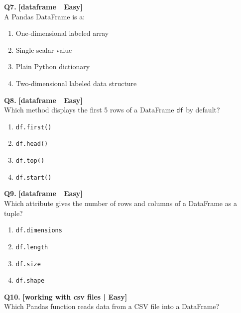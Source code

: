 \noindent\textbf{Q7.} \hfill {\small\color{LPUOrange}\textbf{[dataframe | Easy]}}\\[2pt]
A Pandas DataFrame is a:

\begin{enumerate}[label=(\alph*),topsep=2pt,itemsep=1pt,partopsep=0pt,parsep=0pt]
    \item \relax One-dimensional labeled array
    \item \relax Single scalar value
    \item \relax Plain Python dictionary
    \item \relax Two-dimensional labeled data structure
\end{enumerate}
\vspace{2mm}

\noindent\textbf{Q8.} \hfill {\small\color{LPUOrange}\textbf{[dataframe | Easy]}}\\[2pt]
Which method displays the first 5 rows of a DataFrame \texttt{df} by default?

\begin{enumerate}[label=(\alph*),topsep=2pt,itemsep=1pt,partopsep=0pt,parsep=0pt]
    \item \relax \texttt{df.first()}
    \item \relax \texttt{df.head()}
    \item \relax \texttt{df.top()}
    \item \relax \texttt{df.start()}
\end{enumerate}
\vspace{2mm}

\noindent\textbf{Q9.} \hfill {\small\color{LPUOrange}\textbf{[dataframe | Easy]}}\\[2pt]
Which attribute gives the number of rows and columns of a DataFrame as a tuple?

\begin{enumerate}[label=(\alph*),topsep=2pt,itemsep=1pt,partopsep=0pt,parsep=0pt]
    \item \relax \texttt{df.dimensions}
    \item \relax \texttt{df.length}
    \item \relax \texttt{df.size}
    \item \relax \texttt{df.shape}
\end{enumerate}
\vspace{2mm}

\noindent\textbf{Q10.} \hfill {\small\color{LPUOrange}\textbf{[working with csv files | Easy]}}\\[2pt]
Which Pandas function reads data from a CSV file into a DataFrame?

